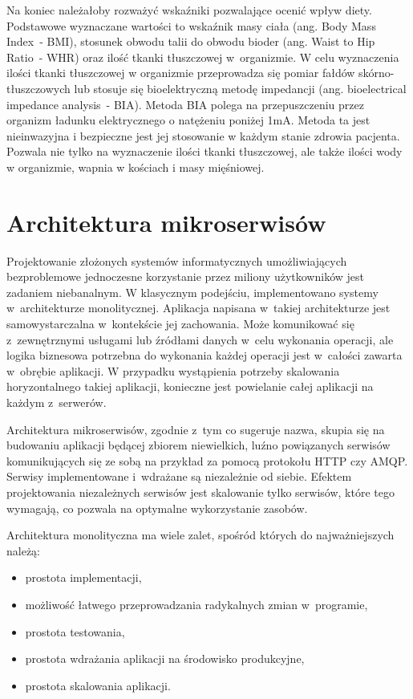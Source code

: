 \par
Na koniec należałoby rozważyć wskaźniki pozwalające ocenić wpływ diety.
Podstawowe wyznaczane wartości to wskaźnik masy ciała (ang. Body Mass Index~- BMI), stosunek obwodu talii do obwodu bioder (ang. Waist to Hip Ratio~- WHR) oraz ilość tkanki tłuszczowej w~organizmie.
W celu wyznaczenia ilości tkanki tłuszczowej w organizmie przeprowadza się pomiar fałdów skórno-tłuszczowych lub stosuje się bioelektryczną metodę impedancji (ang. bioelectrical impedance analysis~- BIA).
Metoda BIA polega na przepuszczeniu przez organizm ładunku elektrycznego o natężeniu poniżej 1mA.
Metoda ta jest nieinwazyjna i bezpieczne jest jej stosowanie w każdym stanie zdrowia pacjenta.
Pozwala nie tylko na wyznaczenie ilości tkanki tłuszczowej, ale także ilości wody w organizmie, wapnia w kościach i masy mięśniowej\cite{book:dietetyka-zywienie-zdrowego-i-chorego-czlowieka}.

\section{Architektura mikroserwisów}\label{sec:usefull-technologies}

Projektowanie złożonych systemów informatycznych umożliwiających bezproblemowe jednoczesne korzystanie przez miliony użytkowników jest zadaniem niebanalnym.
W klasycznym podejściu, implementowano systemy w~architekturze monolitycznej.
Aplikacja napisana w~takiej architekturze jest samowystarczalna w~kontekście jej zachowania.
Może komunikować się z~zewnętrznymi usługami lub źródłami danych w~celu wykonania operacji,
ale logika biznesowa potrzebna do wykonania każdej operacji jest w~całości zawarta w~obrębie aplikacji.
W przypadku wystąpienia potrzeby skalowania horyzontalnego takiej aplikacji,
konieczne jest powielanie całej aplikacji na każdym z~serwerów\cite{url:microsoft-web-architectures}.

\par
Architektura mikroserwisów, zgodnie z~tym co sugeruje nazwa, skupia się na budowaniu aplikacji będącej zbiorem niewielkich,
luźno powiązanych serwisów komunikujących się ze sobą na przykład za pomocą protokołu HTTP czy AMQP.
Serwisy implementowane i~wdrażane są niezależnie od siebie\cite{book:dot-net-microservices}.
Efektem projektowania niezależnych serwisów jest skalowanie tylko serwisów, które tego wymagają,
co pozwala na optymalne wykorzystanie zasobów\cite{book:mastering-microservices-with-java9}.

\par
Architektura monolityczna ma wiele zalet\cite{book:microservices-patterns}, spośród których do najważniejszych należą:
\begin{itemize}
    \item prostota implementacji,
    \item możliwość łatwego przeprowadzania radykalnych zmian w~programie,
    \item prostota testowania,
    \item prostota wdrażania aplikacji na środowisko produkcyjne,
    \item prostota skalowania aplikacji.
\end{itemize}

